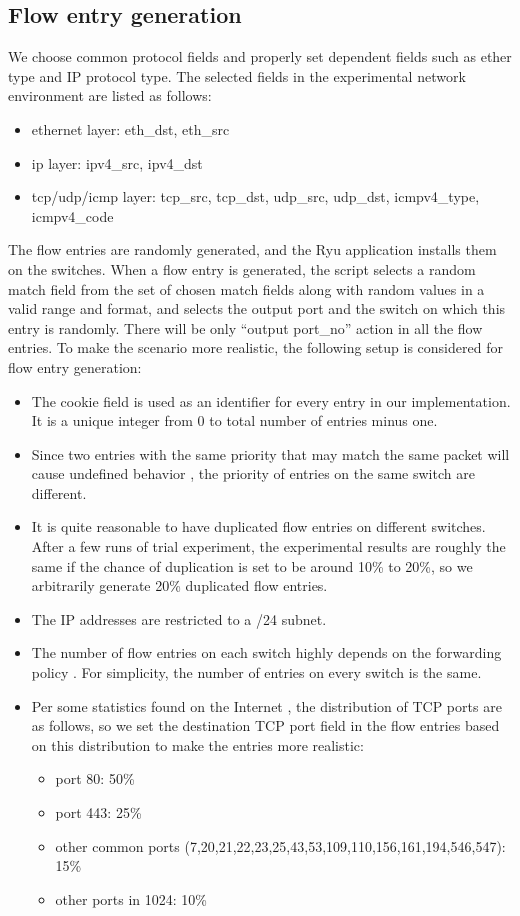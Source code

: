 \documentclass[conference]{IEEEtran}
\begin{document}
\subsection{Flow entry generation}
\label{flow_entry_generation}
We choose common protocol fields and properly set dependent fields such as ether type and IP protocol type. The selected fields in the experimental network environment are listed as follows:

\begin{itemize}
\item
ethernet layer: eth\_dst, eth\_src
\item
ip layer: ipv4\_src, ipv4\_dst
\item
tcp/udp/icmp layer: tcp\_src, tcp\_dst, udp\_src, udp\_dst, icmpv4\_type, icmpv4\_code
\end{itemize}

The flow entries are randomly generated, and the Ryu application installs them on the switches. When a flow entry is generated, the script selects a random match field from the set of chosen match fields along with random values in a valid range and format, and selects the output port and the switch on which this entry is randomly. There will be only ``output port\_no'' action in all the flow entries. To make the scenario more realistic, the following setup is considered for flow entry generation:

\begin{itemize}
\item 
The cookie field is used as an identifier for every entry in our implementation. It is a unique integer from 0 to total number of entries minus one.
\item
Since two entries with the same priority that may match the same packet will cause undefined behavior \cite{OF_SPEC}, the priority of entries on the same switch are different.
\item
It is quite reasonable to have duplicated flow entries on different switches. After a few runs of trial experiment, the experimental results are roughly the same if the chance of duplication is set to be around 10\% to 20\%, so we arbitrarily generate 20\% duplicated flow entries. 
\item
The IP addresses are restricted to a /24 subnet.
\item
The number of flow entries on each switch highly depends on the forwarding policy \cite{MPFHMRSV09}. For simplicity, the number of entries on every switch is the same. 
\item
Per some statistics found on the Internet \cite{PORT_FREQ}, the distribution of TCP ports are as follows, so we set the destination TCP port field in the flow entries based on this distribution to make the entries more realistic:
\begin{itemize}
\item
port 80: 50\%
\item
port 443: 25\%
\item
other common ports (7,20,21,22,23,25,43,53,109,110,156,161,194,546,547): 15\%
\item
other ports in 1024: 10\%
\end{itemize}
\end{itemize}
\end{document}
